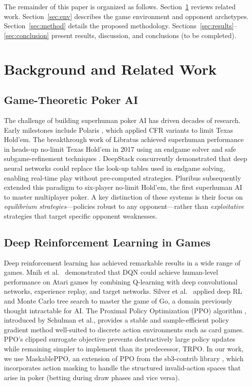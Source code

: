 \documentclass[conference]{IEEEtran}
\begin{document}
The remainder of this paper is organized as follows.
Section~\ref{sec:related} reviews related work. Section~\ref{sec:env}
describes the game environment and opponent archetypes.
Section~\ref{sec:method} details the proposed methodology.
Sections~\ref{sec:results}--\ref{sec:conclusion} present results,
discussion, and conclusions (to be completed).

\section{Background and Related Work}
\label{sec:related}

\subsection{Game-Theoretic Poker AI}

The challenge of building superhuman poker AI has driven decades of
research. Early milestones include Polaris \cite{zinkevich2007regret},
which applied CFR variants to limit Texas Hold'em. The breakthrough
work of Libratus \cite{brown2018libratus} achieved superhuman
performance in heads-up no-limit Texas Hold'em in 2017 using an
endgame solver and safe subgame-refinement techniques \cite{ganzfried2015endgame}.
DeepStack \cite{moravcik2017deepstack} concurrently demonstrated that
deep neural networks could replace the look-up tables used in
endgame solving, enabling real-time play without pre-computed
strategies. Pluribus \cite{brown2019superhuman} subsequently extended
this paradigm to six-player no-limit Hold'em, the first superhuman
AI to master multiplayer poker. A key distinction of these systems is
their focus on \textit{equilibrium strategies}---policies robust to
any opponent---rather than \textit{exploitative} strategies that
target specific opponent weaknesses.

\subsection{Deep Reinforcement Learning in Games}

Deep reinforcement learning has achieved remarkable results in a wide
range of games. Mnih et al.~\cite{mnih2015human} demonstrated that
DQN could achieve human-level performance on Atari games by combining
Q-learning with deep convolutional networks, experience replay, and
target networks. Silver et al.~\cite{silver2016mastering} applied
deep RL and Monte Carlo tree search to master the game of Go, a
domain previously thought intractable for AI. The Proximal Policy
Optimization (PPO) algorithm \cite{schulman2017proximal}, introduced
by Schulman et al., provides a stable and sample-efficient policy
gradient method well-suited to discrete action environments such as
card games. PPO's clipped surrogate objective prevents destructively
large policy updates while remaining simpler to implement than its
predecessor, TRPO. In our work, we use MaskablePPO, an extension of
PPO from the sb3-contrib library \cite{raffin2021stable}, which
incorporates action masking to handle the structured invalid-action
spaces that arise in poker (betting during draw phases and vice versa).
\end{document}
